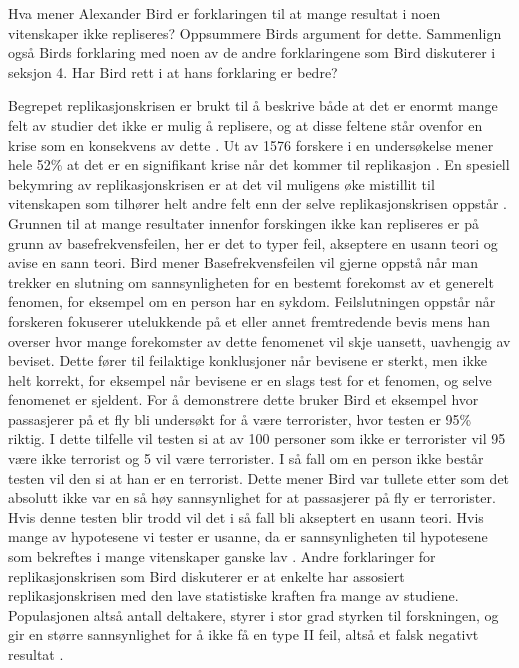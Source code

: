 \documentclass[
]{book}
\begin{document}
Hva mener Alexander Bird er forklaringen til at mange resultat i noen vitenskaper ikke repliseres?
Oppsummere Birds argument for dette.
Sammenlign også Birds forklaring med noen av de andre forklaringene som Bird diskuterer i seksjon 4.
Har Bird rett i at hans forklaring er bedre?

Begrepet replikasjonskrisen er brukt til å beskrive både at det er enormt mange felt av studier det ikke er mulig å replisere, og at disse feltene står ovenfor en krise som en konsekvens av dette \citet{bird2020}.
Ut av 1576 forskere i en undersøkelse mener hele 52\% at det er en signifikant krise når det kommer til replikasjon \citet{baker2016} .
En spesiell bekymring av replikasjonskrisen er at det vil muligens øke mistillit til vitenskapen som tilhører helt andre felt enn der selve replikasjonskrisen oppstår \citet{bird2020}.\\
Grunnen til at mange resultater innenfor forskingen ikke kan repliseres er på grunn av basefrekvensfeilen, her er det to typer feil, akseptere en usann teori og avise en sann teori.
Bird \citet{bird2020} mener Basefrekvensfeilen vil gjerne oppstå når man trekker en slutning om sannsynligheten for en bestemt forekomst av et generelt fenomen, for eksempel om en person har en sykdom.
Feilslutningen oppstår når forskeren fokuserer utelukkende på et eller annet fremtredende bevis mens han overser hvor mange forekomster av dette fenomenet vil skje uansett, uavhengig av beviset.
Dette fører til feilaktige konklusjoner når bevisene er sterkt, men ikke helt korrekt, for eksempel når bevisene er en slags test for et fenomen, og selve fenomenet er sjeldent.
For å demonstrere dette bruker Bird et eksempel hvor passasjerer på et fly bli undersøkt for å være terrorister, hvor testen er 95\% riktig.
I dette tilfelle vil testen si at av 100 personer som ikke er terrorister vil 95 være ikke terrorist og 5 vil være terrorister.
I så fall om en person ikke består testen vil den si at han er en terrorist.
Dette mener Bird var tullete etter som det absolutt ikke var en så høy sannsynlighet for at passasjerer på fly er terrorister.
Hvis denne testen blir trodd vil det i så fall bli akseptert en usann teori.
Hvis mange av hypotesene vi tester er usanne, da er sannsynligheten til hypotesene som bekreftes i mange vitenskaper ganske lav \citet{bird2020}.
Andre forklaringer for replikasjonskrisen som Bird diskuterer er at enkelte har assosiert replikasjonskrisen med den lave statistiske kraften fra mange av studiene.
Populasjonen altså antall deltakere, styrer i stor grad styrken til forskningen, og gir en større sannsynlighet for å ikke få en type II feil, altså et falsk negativt resultat \citet{bird2020}.
\end{document}
